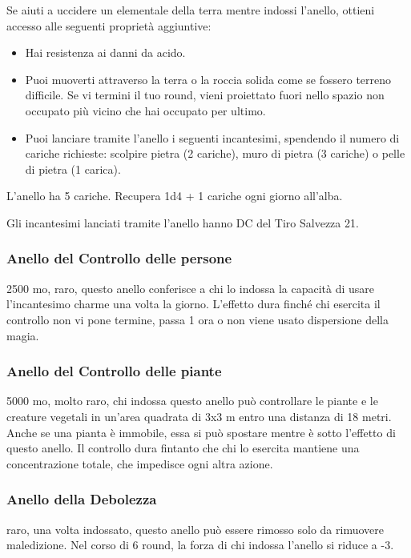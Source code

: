\begin{multicols}{2}
Se aiuti a uccidere un elementale della terra mentre indossi l'anello, ottieni accesso alle seguenti proprietà aggiuntive:

\medskip

\begin{itemize}
\item
Hai resistenza ai danni da acido.
\item
Puoi muoverti attraverso la terra o la roccia solida come se fossero terreno difficile. Se vi termini il tuo round, vieni proiettato fuori nello spazio non occupato più vicino che hai occupato per ultimo.
\item
Puoi lanciare tramite l'anello i seguenti incantesimi, spendendo il numero di cariche richieste: scolpire pietra (2 cariche), muro di pietra (3 cariche) o pelle di pietra (1 carica).
\end{itemize}

\medskip

L'anello ha 5 cariche. Recupera 1d4 + 1 cariche ogni giorno all'alba.

Gli incantesimi lanciati tramite l'anello hanno DC del Tiro Salvezza 21.

\subsubsection*{Anello del Controllo delle persone}
2500 mo, raro, questo anello conferisce a chi lo indossa la capacità di usare l'incantesimo charme una volta la giorno. L'effetto dura finché chi esercita il controllo non vi pone termine, passa 1 ora o non viene usato dispersione della magia.

\subsubsection*{Anello del Controllo delle piante}
5000 mo, molto raro, chi indossa questo anello può controllare le piante e le creature vegetali in un’area quadrata di 3x3 m entro una distanza di 18 metri. Anche se una pianta è immobile, essa si può spostare mentre è sotto l’effetto di questo anello. Il controllo dura fintanto che chi lo esercita mantiene una concentrazione totale, che impedisce ogni altra azione.

\subsubsection*{Anello della Debolezza}
raro, una volta indossato, questo anello può essere rimosso solo da rimuovere maledizione. Nel corso di 6 round, la forza di chi indossa l’anello si riduce a -3.


\end{multicols}
